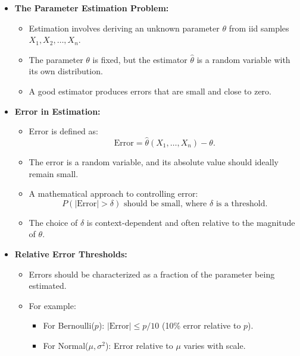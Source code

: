\documentclass{article}
\begin{document}
\begin{itemize}
  \item \textbf{The Parameter Estimation Problem:}
    \begin{itemize}
      \item Estimation involves deriving an unknown parameter $\theta$ from iid samples $X_1, X_2, \dots, X_n$.
      \item The parameter $\theta$ is fixed, but the estimator $\hat{\theta}$ is a random variable with its own distribution.
      \item A good estimator produces errors that are small and close to zero.
    \end{itemize}

  \item \textbf{Error in Estimation:}
    \begin{itemize}
      \item Error is defined as:
        \[
          \text{Error} = \hat{\theta}(X_1, \dots, X_n) - \theta.
        \]
      \item The error is a random variable, and its absolute value should ideally remain small.
      \item A mathematical approach to controlling error:
        \[
          P(|\text{Error}| > \delta) \text{ should be small, where } \delta \text{ is a threshold.}
        \]
      \item The choice of $\delta$ is context-dependent and often relative to the magnitude of $\theta$.
    \end{itemize}

  \item \textbf{Relative Error Thresholds:}
    \begin{itemize}
      \item Errors should be characterized as a fraction of the parameter being estimated.
      \item For example:
        \begin{itemize}
          \item For Bernoulli($p$): $|\text{Error}| \leq p / 10$ (10\% error relative to $p$).
          \item For Normal($\mu, \sigma^2$): Error relative to $\mu$ varies with scale.
        \end{itemize}
    \end{itemize}


\end{itemize}
\end{document}
